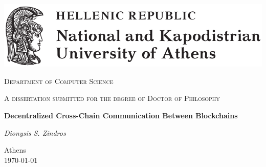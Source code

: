 \begin{titlepage}
  \centering
  \includegraphics[width=\textwidth]{figures/uoa.pdf}\par\vspace{1cm}
  {\scshape\Large Department of Computer Science\par}
  \vspace{1cm}
  {\scshape A dissertation submitted for the degree of Doctor of Philosophy\par}
  \vspace{1cm}
  {\huge\bfseries Decentralized Cross-Chain Communication Between Blockchains\par}
  \vspace{2cm}
  {\Large\itshape Dionysis \ifuniversity S. \fi Zindros\par}
	\vfill
	{\large Athens\\\today\par}
\end{titlepage}
